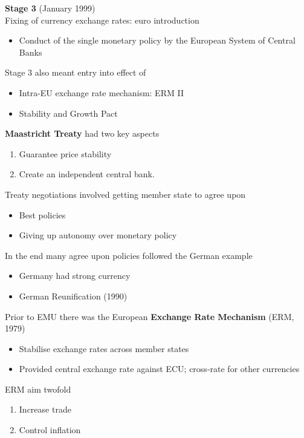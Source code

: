 \documentclass{beamer}
\begin{document}
\begin{frame}
  \textbf{Stage 3} (January 1999)\\
  Fixing of currency exchange rates: euro introduction
  \begin{itemize}
    \item Conduct of the single monetary policy by the European System of Central Banks
  \end{itemize}
  \medskip
  Stage 3 also meant entry into effect of
  \begin{itemize}
    \item Intra-EU exchange rate mechanism: ERM II
    \item Stability and Growth Pact
  \end{itemize}
\end{frame}

\begin{frame}
    \textbf{Maastricht Treaty} had two key aspects
\begin{enumerate}
  \item Guarantee price stability 
  \item Create an independent central bank. 
\end{enumerate}
\medskip
Treaty negotiations involved getting member state to agree upon
\begin{itemize}
  \item Best policies
  \item Giving up autonomy over monetary policy
\end{itemize}
\medskip
In the end many agree upon policies followed the German example
\begin{itemize}
  \item Germany had strong currency
  \item German Reunification (1990)
\end{itemize}
\end{frame}

\begin{frame}
  Prior to EMU there was the European \textbf{Exchange Rate Mechanism} (ERM, 1979)\\
  \begin{itemize}
    \item Stabilise exchange rates across member states
    \item Provided central exchange rate against ECU; cross-rate for other currencies
  \end{itemize}
  \medskip
  ERM aim twofold
  \begin{enumerate}
    \item Increase trade
    \item Control inflation
  \end{enumerate}
\end{frame}
\end{document}
